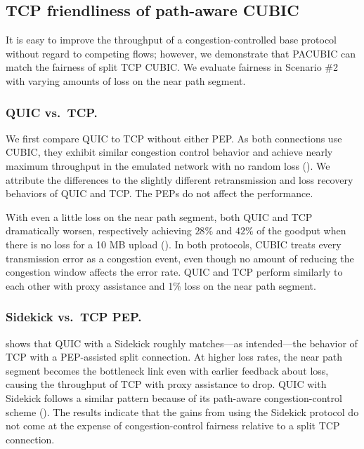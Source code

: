 \subsection{TCP friendliness of path-aware CUBIC}
\label{sec:sidekick:emulation:pacubic}




It is easy to improve the throughput of a congestion-controlled base protocol
without regard to competing flows; however, we demonstrate that PACUBIC can
match the fairness of split TCP CUBIC\@.
We evaluate fairness in Scenario \#2 with varying amounts of loss on the
near path segment.

\subsubsection{QUIC vs.\ TCP\@.}
We first compare QUIC to TCP without either PEP\@.
As both connections use CUBIC, they exhibit similar
congestion control behavior and achieve nearly maximum throughput in the
emulated network with no random loss ().
We attribute the differences to the slightly different retransmission and
loss recovery behaviors of QUIC and TCP\@. The PEPs do not affect the
performance.

With even a little loss on the near path segment, both QUIC and TCP dramatically
worsen, respectively achieving $28\%$ and $42\%$ of the goodput when there is no loss
for a 10 MB upload ().
In both protocols, CUBIC treats every transmission error as a congestion event,
even though no amount of reducing the congestion window affects the error rate.
QUIC and TCP perform similarly to each other with proxy assistance and 1\%
loss on the near path segment.

\subsubsection{Sidekick vs.\ TCP PEP\@.}

 shows that QUIC with a Sidekick roughly
matches---as intended---the behavior of TCP with a PEP-assisted split
connection. At higher loss rates, the near path segment becomes the bottleneck
link even with earlier feedback about loss, causing the throughput of TCP with
proxy assistance to drop. QUIC with Sidekick follows a similar pattern
because of its path-aware congestion-control scheme
(). The results indicate that the gains from
using the Sidekick protocol do not come at the expense of congestion-control fairness
relative to a split TCP connection.
